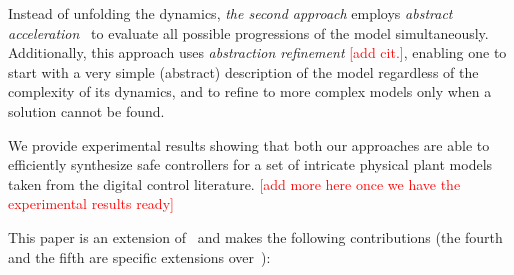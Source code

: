 \documentclass[twocolumn]{autart}    %
\newcommand{\addtodo}[1]{\textcolor{red}{[#1]}}
\renewcommand{\note}[1]{\textcolor{red}{[#1]}}
\begin{document}
Instead of unfolding the dynamics, \emph{the second approach}
employs \emph{abstract acceleration}~\cite{cattaruzza2015unbounded} to
evaluate all possible progressions of the model simultaneously. 
Additionally, this approach uses \emph{abstraction refinement} \note{add cit.},
enabling one to start with a very simple (abstract) description of the model 
regardless of the complexity of its dynamics, and to refine to more complex models only 
when a solution cannot be found.

We provide experimental results showing that both our approaches are able to
efficiently synthesize safe controllers for a set of intricate physical
plant models taken from the digital control literature.
\addtodo{add more here once we have the experimental results ready}

This paper is an extension of~\cite{DBLP:conf/cav/AbateBCCDKKP17}
and makes the following contributions (the fourth and the fifth are
specific extensions over~\cite{DBLP:conf/cav/AbateBCCDKKP17}): 
%
\end{document}
